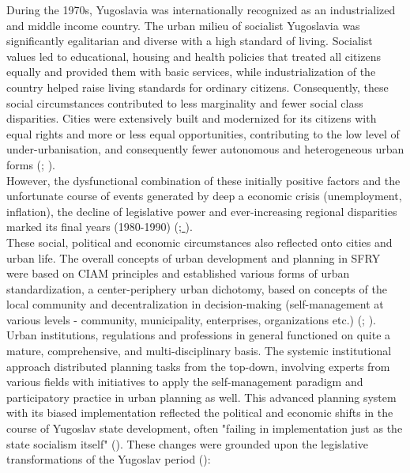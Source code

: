 \documentclass[11pt]{report}
\begin{document}
{{{{During the 1970s, Yugoslavia was internationally recognized as an industrialized and middle income country. The urban milieu of socialist Yugoslavia was significantly egalitarian and diverse with a high standard of living. Socialist values led to educational, housing and health policies that treated all citizens equally and provided them with basic services, while industrialization of the country helped raise living standards for ordinary citizens. Consequently, these social circumstances contributed to less marginality and fewer social class disparities. Cities were extensively built and modernized for its citizens with equal rights and more or less equal opportunities, contributing to the low level of under-urbanisation, and consequently fewer autonomous and heterogeneous urban forms (\href{Vujovic}{\citealt{vujovic_belgrades_2007}}; \href{Stanek}{\citealt{stanek_urban_2014}}).
\\

However, the dysfunctional combination of these initially positive factors and the unfortunate course of events generated by deep a economic crisis (unemployment, inflation), the decline of legislative power and ever-increasing regional disparities marked its final years (1980-1990)  (\href{Estrin}{\citealt{estrin_yugoslavia:_1991}};\href{Stamolieva}{ \citealt{stambolieva_welfare_2013}}).
\\

These social, political and economic circumstances also reflected onto cities and urban life. The overall concepts of urban development and planning in SFRY were based on CIAM principles and established various forms of urban standardization, a center-periphery urban dichotomy, based on concepts of the local community and decentralization in decision-making (self-management at various levels - community, municipality, enterprises, organizations etc.) (\href{Fisher}{\citealt{fisher_planning_1962}}; \href{Nedovic}{\citealt{nedovicbudic_waves_2006}}).
Urban institutions, regulations and professions in general functioned on quite a mature, comprehensive, and multi-disciplinary basis. The systemic institutional approach distributed planning tasks from the top-down, involving experts from various fields with initiatives to apply the self-management paradigm and participatory practice in urban planning as well.  This advanced planning system with its biased implementation reflected the political and economic shifts in the course of Yugoslav state development, often "failing in implementation just as the state socialism itself" (\href{Nedovic}{\citealt{nedovicbudic_waves_2006}}). These changes were grounded upon the legislative transformations of the Yugoslav period (\href{Nedovic}{\citealt{nedovicbudic_waves_2006}}):
\begin{enumerate}


\end{enumerate}}}}}
\end{document}
